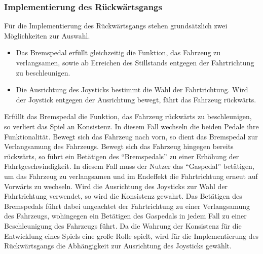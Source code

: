 	\subsubsection{Implementierung des Rückwärtsgangs}
	Für die Implementierung des Rückwärtsgangs stehen grundsätzlich zwei Möglichkeiten zur Auswahl.
	\begin{itemize}
		\item{ Das Bremspedal erfüllt gleichzeitig die Funktion, das Fahrzeug zu verlangsamen, sowie ab Erreichen des Stillstands entgegen der Fahrtrichtung zu beschleunigen.}
		\item{ Die Ausrichtung des Joysticks bestimmt die Wahl der Fahrtrichtung. Wird der Joystick entgegen der Ausrichtung bewegt, fährt das Fahrzeug rückwärts.}
	\end{itemize}
	Erfüllt das Bremspedal die Funktion, das Fahrzeug rückwärts zu beschleunigen, so verliert das Spiel an Konsistenz. In diesem Fall wechseln die beiden Pedale ihre Funktionalität. Bewegt sich das Fahrzeug nach vorn, so dient das Bremspedal zur Verlangsamung des Fahrzeugs. Bewegt sich das Fahrzeug hingegen bereits rückwärts, so führt ein Betätigen des \enquote{Bremspedals} zu einer Erhöhung der Fahrtgeschwindigkeit. In diesem Fall muss der Nutzer das \enquote{Gaspedal} betätigen, um das Fahrzeug zu verlangsamen und im Endeffekt die Fahrtrichtung erneut auf Vorwärts zu wechseln.
	Wird die Ausrichtung des Joysticks zur Wahl der Fahrtrichtung verwendet, so wird die Konsistenz gewahrt. Das Betätigen des Bremspedals führt dabei ungeachtet der Fahrtrichtung zu einer Verlangsamung des Fahrzeugs, wohingegen ein Betätigen des Gaspedals in jedem Fall zu einer Beschleunigung des Fahrzeugs führt. Da die Wahrung der Konsistenz für die Entwicklung eines Spiels eine große Rolle spielt, wird für die Implementierung des Rückwärtsgangs die Abhängigkeit zur Ausrichtung des Joysticks gewählt.


